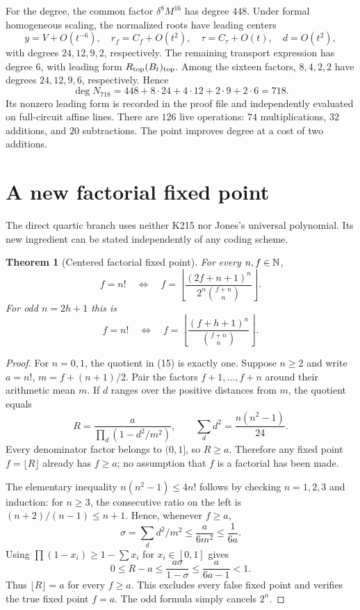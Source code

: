 \documentclass[11pt,letterpaper]{article}
\newtheorem{theorem}{Theorem}[section]
\theoremstyle{definition}\newtheorem{definition}[theorem]{Definition}
\theoremstyle{remark}\newtheorem{remark}[theorem]{Remark}
\begin{document}
For the degree, the common factor $\delta^8M^{16}$ has degree $448$. Under formal homogeneous scaling, the normalized roots have leading centers
\[
 y=V+O(t^{-6}),\quad r_f=C_f+O(t^2),\quad
 \tau=C_\tau+O(t),\quad d=O(t^2),
\]
with degrees $24,12,9,2$, respectively. The remaining transport expression has degree $6$, with leading form $R_{\rm top}(B_t)_{\rm top}$. Among the sixteen factors, $8,4,2,2$ have degrees $24,12,9,6$, respectively. Hence
\[
 \deg N_{718}=448+8\cdot24+4\cdot12+2\cdot9+2\cdot6=718.
\]
Its nonzero leading form is recorded in the proof file and independently evaluated on full-circuit affine lines. There are $126$ live operations: $74$ multiplications, $32$ additions, and $20$ subtractions. The point improves degree at a cost of two additions.

\section{A new factorial fixed point}
The direct quartic branch uses neither K215 nor Jones's universal polynomial. Its new ingredient can be stated independently of any coding scheme.

\begin{theorem}[Centered factorial fixed point]\label{thm:factorial}
For every $n,f\in\mathbb N$,
\[
 \boxed{\quad
 f=n!\quad\Longleftrightarrow\quad
 f=\left\lfloor\frac{(2f+n+1)^n}{2^n\binom{f+n}{n}}\right\rfloor.
 \quad}\tag{15}\label{eq:factorial}
\]
For odd $n=2h+1$ this is
\[
 f=n!\quad\Longleftrightarrow\quad
 f=\left\lfloor\frac{(f+h+1)^n}{\binom{f+n}{n}}\right\rfloor.
 \tag{16}\label{eq:oddfactorial}
\]
\end{theorem}
\begin{proof}
For $n=0,1$, the quotient in (15) is exactly one. Suppose $n\ge2$ and write $a=n!$, $m=f+(n+1)/2$. Pair the factors $f+1,\ldots,f+n$ around their arithmetic mean $m$. If $d$ ranges over the positive distances from $m$, the quotient equals
\[
 R=\frac{a}{\prod_d(1-d^2/m^2)},\qquad
 \sum_d d^2=\frac{n(n^2-1)}{24}.
\]
Every denominator factor belongs to $(0,1]$, so $R\ge a$. Therefore any fixed point $f=\lfloor R\rfloor$ already has $f\ge a$; no assumption that $f$ is a factorial has been made.

The elementary inequality $n(n^2-1)\le4n!$ follows by checking $n=1,2,3$ and induction: for $n\ge3$, the consecutive ratio on the left is $(n+2)/(n-1)\le n+1$. Hence, whenever $f\ge a$,
\[
 \sigma=\sum_d d^2/m^2\le\frac{a}{6m^2}\le\frac1{6a}.
\]
Using $\prod(1-x_i)\ge1-\sum x_i$ for $x_i\in[0,1]$ gives
\[
 0\le R-a\le\frac{a\sigma}{1-\sigma}
 \le\frac{a}{6a-1}<1.
\]
Thus $\lfloor R\rfloor=a$ for every $f\ge a$. This excludes every false fixed point and verifies the true fixed point $f=a$. The odd formula simply cancels $2^n$.
\end{proof}
\end{document}
